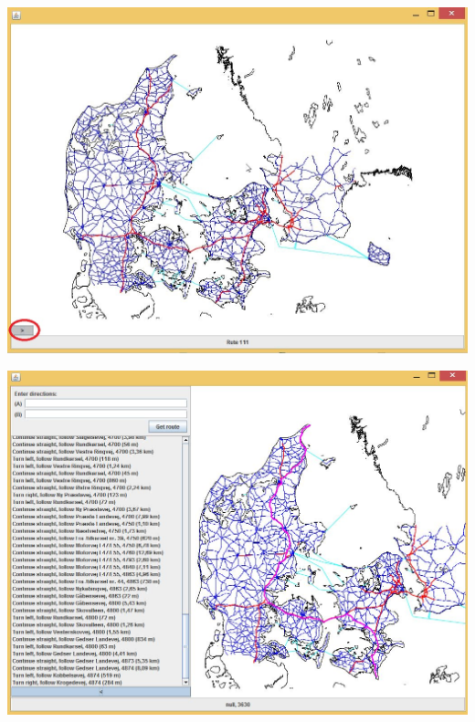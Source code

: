 \begin{center}
\includegraphics[width=(\textwidth)/2]{brugervejledning/halvrenkort}
\end{center}

\begin{center}
\includegraphics[width=(\textwidth)/2]{brugervejledning/klikkort}
\end{center}